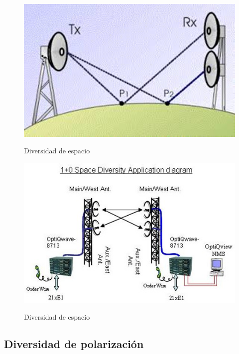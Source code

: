 \begin{figure}[h!]
	\captionsetup{justification = raggedright, singlelinecheck = false}
	\caption{Diversidad de espacio} 
	\centering
	\includegraphics[scale=1]{Imagenes/Antenas-TX.png}
	\label{fig:Antenas-TX}
\end{figure}
\vspace{200px}

\begin{figure}[h!]
	\captionsetup{justification = raggedright, singlelinecheck = false}
	\caption{Diversidad de espacio} 
	\centering
	\includegraphics[scale=1]{Imagenes/Antenas-RX.png}
	\label{fig:Antenas-RX}
\end{figure}

\subsection{Diversidad de polarización}

